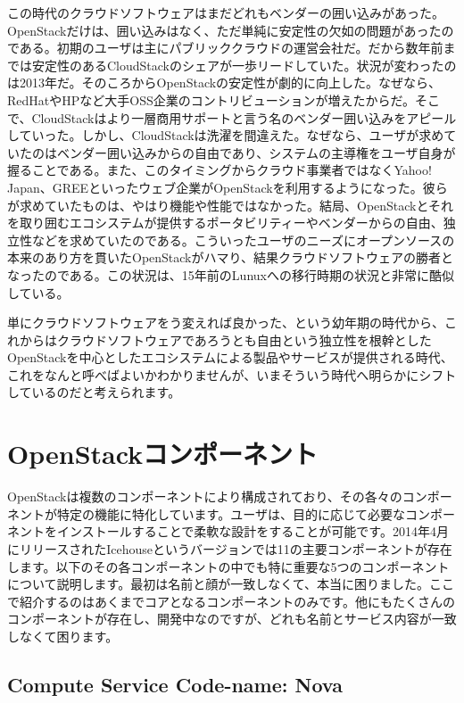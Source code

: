 \documentclass[8pt,b5paper,tombo,openany]{jsbook}
\begin{document}
この時代のクラウドソフトウェアはまだどれもベンダーの囲い込みがあった。OpenStackだけは、囲い込みはなく、ただ単純に安定性の欠如の問題があったのである。初期のユーザは主にパブリッククラウドの運営会社だ。だから数年前までは安定性のあるCloudStackのシェアが一歩リードしていた。状況が変わったのは2013年だ。そのころからOpenStackの安定性が劇的に向上した。なぜなら、RedHatやHPなど大手OSS企業のコントリビューションが増えたからだ。そこで、CloudStackはより一層商用サポートと言う名のベンダー囲い込みをアピールしていった。しかし、CloudStackは洗濯を間違えた。なぜなら、ユーザが求めていたのはベンダー囲い込みからの自由であり、システムの主導権をユーザ自身が握ることである。また、このタイミングからクラウド事業者ではなくYahoo! Japan、GREEといったウェブ企業がOpenStackを利用するようになった。彼らが求めていたものは、やはり機能や性能ではなかった。結局、OpenStackとそれを取り囲むエコシステムが提供するポータビリティーやベンダーからの自由、独立性などを求めていたのである。こういったユーザのニーズにオープンソースの本来のあり方を貫いたOpenStackがハマり、結果クラウドソフトウェアの勝者となったのである。この状況は、15年前のLunuxへの移行時期の状況と非常に酷似している。

単にクラウドソフトウェアをう変えれば良かった、という幼年期の時代から、これからはクラウドソフトウェアであろうとも自由という独立性を根幹としたOpenStackを中心としたエコシステムによる製品やサービスが提供される時代、これをなんと呼べばよいかわかりませんが、いまそういう時代へ明らかにシフトしているのだと考えられます。

\section{OpenStackコンポーネント}

OpenStackは複数のコンポーネントにより構成されており、その各々のコンポーネントが特定の機能に特化しています。ユーザは、目的に応じて必要なコンポーネントをインストールすることで柔軟な設計をすることが可能です。2014年4月にリリースされたIcehouseというバージョンでは11の主要コンポーネントが存在します。以下のその各コンポーネントの中でも特に重要な5つのコンポーネントについて説明します。最初は名前と顔が一致しなくて、本当に困りました。ここで紹介するのはあくまでコアとなるコンポーネントのみです。他にもたくさんのコンポーネントが存在し、開発中なのですが、どれも名前とサービス内容が一致しなくて困ります。

\subsection{Compute Service Code-name: Nova}
\end{document}
